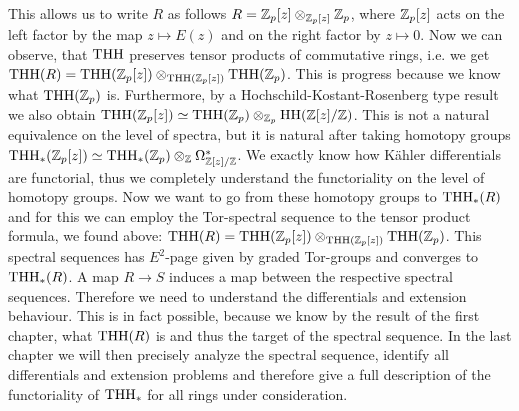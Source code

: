 This allows us to write $R$ as follows $R=\mathbb{Z}_p[z]\otimes_{\mathbb{Z}_p[z]}\mathbb{Z}_p$, where $\mathbb{Z}_p[z]$ acts on the left factor by the map $z\mapsto E(z)$ and on the right factor by $z\mapsto 0$. 
Now we can observe, that $\operatorname{THH}$ preserves tensor products of commutative rings, i.e. we get $\operatorname{THH}(R)=\operatorname{THH}(\mathbb{Z}_p[z])\otimes_{\operatorname{THH}(\mathbb{Z}_p[z])}\operatorname{THH}(\mathbb{Z}_p)$. This is progress because we know what $\operatorname{THH}(\mathbb{Z}_p)$ is. Furthermore, by a Hochschild-Kostant-Rosenberg type result we also obtain $\operatorname{THH}(\mathbb{Z}_p[z])\simeq\operatorname{THH}(\mathbb{Z}_p)\otimes_{\mathbb{Z}_p}\operatorname{HH}(\mathbb{Z}[z]/\mathbb{Z})$. This is not a natural equivalence on the level of spectra, but it is natural after taking homotopy groups $\operatorname{THH}_*(\mathbb{Z}_p[z])\simeq\operatorname{THH}_*(\mathbb{Z}_p)\otimes_{\mathbb{Z}}\Omega^*_{\mathbb{Z}[z]/\mathbb{Z}}$. We exactly know how Kähler differentials are functorial, thus we completely understand the functoriality on the level of homotopy groups. Now we want to go from these homotopy groups to $\operatorname{THH}_*(R)$ and for this we can employ the Tor-spectral sequence to the tensor product formula, we found above: $\operatorname{THH}(R)=\operatorname{THH}(\mathbb{Z}_p[z])\otimes_{\operatorname{THH}(\mathbb{Z}_p[z])}\operatorname{THH}(\mathbb{Z}_p)$. This spectral sequences has $E^2$-page given by graded Tor-groups and converges to $\operatorname{THH}_*(R)$. A map $R\to S$ induces a map between the respective spectral sequences. Therefore we need to understand the differentials and extension behaviour. This is in fact possible, because we know by the result of the first chapter, what $\operatorname{THH}(R)$ is and thus the target of the spectral sequence. In the last chapter we will then precisely analyze the spectral sequence, identify all differentials and extension problems and therefore give a full description of the functoriality of $\operatorname{THH}_*$ for all rings under consideration. 
